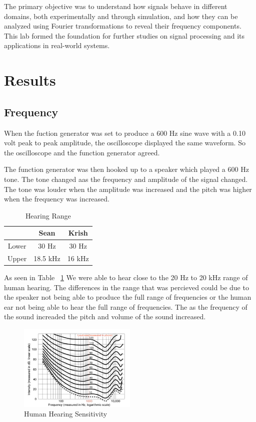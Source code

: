 \documentclass{article}
\begin{document}
The primary objective was to understand how signals behave in different domains,
both experimentally and through simulation, and how they can be analyzed using
Fourier transformations to reveal their frequency components. This lab formed
the foundation for further studies on signal processing and its applications in
real-world systems.

\section{Results}
\subsection{Frequency}
When the fuction generator was set to produce a 600 Hz sine wave with a 0.10 volt peak to peak 
amplitude, the oscilloscope displayed the same waveform. So the oscilloscope and the function generator agreed.
\newline

The function generator was then hooked up to a speaker which played a 600 Hz tone. The tone changed aas the frequency and
amplitude of the signal changed. The tone was louder when the amplitude was increased and the pitch was higher when the frequency was increased.
\newline
\begin{table}[H]
    \centering
    \begin{tabular}{|c|c|c|}
        \hline
         & Sean & Krish\\
        \hline
        Lower & 30 Hz & 30 Hz \\
        \hline
        Upper & 18.5 kHz & 16 kHz \\
        \hline
    \end{tabular}
    \caption{Hearing Range}
    \label{tab:1.2 hearing range}
\end{table}

As seen in Table ~\ref{tab:1.2 hearing range} We were able to hear close to the 20 Hz to 20 kHz range of human hearing. 
The differences in the range that was percieved could be due to the speaker not being able to produce the full range of 
frequencies or the human ear not being able to hear the full range of frequencies. The as the frequency of the sound 
increaded the pitch and volume of the sound increased.

\begin{figure}[H]
	\centering
	\includegraphics[width=0.5\textwidth]{frequencytointensity.png}
	\caption{Human Hearing Sensitivity}
	\label{fig:fig1}
\end{figure}
\end{document}
